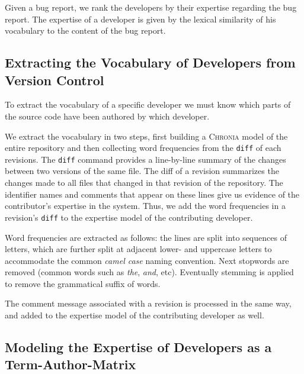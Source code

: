 \documentclass[10pt]{book}
\begin{document}
Given a bug report, we rank the developers by their expertise regarding the bug report. The expertise of a developer is given by the lexical similarity of his vocabulary to the content of the bug report.

\subsection{Extracting the Vocabulary of Developers from Version Control}

To extract the vocabulary of a specific developer we must know which parts of the source code have been authored by which developer. 

We extract the vocabulary in two steps, first building a \textsc{Chronia} model of the entire repository \cite{Girb05c} and then collecting word frequencies from the \verb$diff$ of each revisions. %
The \verb$diff$ command provides a line-by-line summary of the changes between two versions of the same file. The diff of a revision summarizes the changes made to all files that changed in that revision of the repository. The identifier names and comments that appear on these lines give us evidence of the contributor's expertise in the system. Thus, we add the word frequencies in a revision's \verb$diff$ to the expertise model of the contributing developer.

Word frequencies are extracted as follows: the lines are split into sequences of letters, which are further split at adjacent lower- and uppercase letters to accommodate the common \emph{camel case} naming convention. Next stopwords are removed (\ie common words such as \emph{the}, \emph{and}, etc). Eventually stemming %
is applied to remove the grammatical suffix of words.

The comment message associated with a revision is processed in the same way, and added to the expertise model of the contributing developer as well. 


\subsection{Modeling the Expertise of Developers as a Term-Author-Matrix}
\end{document}
